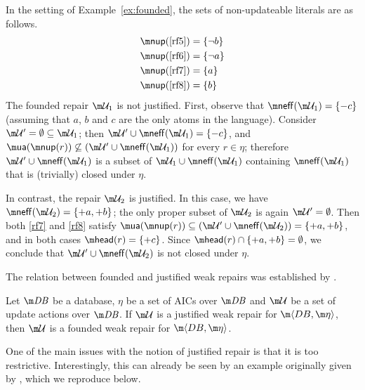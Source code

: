 \begin{example}
  In the setting of Example~\ref{ex:founded}, the sets of non-updateable literals are as follows.
  \begin{align*}
    \nup(\ref{rf5}) &= \{\neg b\} \\
    \nup(\ref{rf6}) &= \{\neg a\} \\
        \nup(\ref{rf7}) &= \{a\} \\
    \nup(\ref{rf8}) &= \{b\}
  \end{align*}
  The founded repair $\UU_1$ is not justified.
  First, observe that $\neff(\UU_1)=\{{-c}\}$ (assuming that $a$, $b$ and $c$ are the only atoms in the language).
  Consider $\UU'=\emptyset\subseteq\UU_1$; then $\UU'\cup\neff(\UU_1)=\{{-c}\}$, and $\actof(\nup(r))\not\subseteq(\UU'\cup\neff(\UU_1))$ for every $r\in\eta$; therefore $\UU'\cup\neff(\UU_1)$ is a subset of $\UU_1\cup\neff(\UU_1)$ containing $\neff(\UU_1)$ that is (trivially) closed under $\eta$.

  In contrast, the repair $\UU_2$ is justified.
  In this case, we have $\neff(\UU_2)=\{{+a},{+b}\}$; the only proper subset of $\UU_2$ is again $\UU'=\emptyset$.
  Then both \ref{rf7} and \ref{rf8} satisfy $\actof(\nup(r))\subseteq(\UU'\cup\neff(\UU_2))=\{{+a},{+b}\}$, and in both cases $\head(r)=\{{+c}\}$.
  Since $\head(r)\cap\{{+a},{+b}\}=\emptyset$, we conclude that $\UU'\cup\neff(\UU_2)$ is not closed under $\eta$.
\end{example}

The relation between founded and justified weak repairs was established by \citet{tplp/CaropreseT11}.
\begin{lemma}
  \label{lem:justified-founded}
  Let $\db$ be a database, $\eta$ be a set of AICs over $\db$ and $\UU$ be a set of update actions over $\db$.
  If $\UU$ is a justified weak repair for $\fulldb$, then $\UU$ is a founded weak repair for $\fulldb$.
\end{lemma}

One of the main issues with the notion of justified repair is that it is too restrictive.
Interestingly, this can already be seen by an example originally given by \citet{tplp/CaropreseT11}, which we reproduce below.

